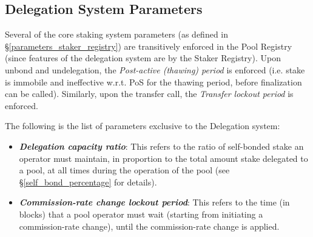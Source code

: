 \subsection{Delegation System Parameters} \label{parameters_pool_registry}
Several of the core staking system parameters (as defined in \S\ref{parameters_staker_registry}) are transitively enforced in the Pool Registry (since features of the delegation system are  by the Staker Registry). Upon unbond and undelegation, the \textit{Post-active (thawing) period} is enforced (i.e. stake is immobile and ineffective w.r.t. PoS for the thawing period, before finalization can be called). Similarly, upon the transfer call, the \textit{Transfer lockout period} is enforced. 

The following is the list of parameters exclusive to the Delegation system: 
\begin{itemize}
    \item \textbf{\textit{Delegation capacity ratio}}: This refers to the ratio of self-bonded stake an operator must maintain, in proportion to the total amount stake delegated to a pool, at all times during the operation of the pool (see \S\ref{self_bond_percentage} for details).
    \item \textbf{\textit{Commission-rate change lockout period}}: This refers to the time (in blocks) that a pool operator must wait (starting from initiating a commission-rate change), until the commission-rate change is applied. 
\end{itemize}

